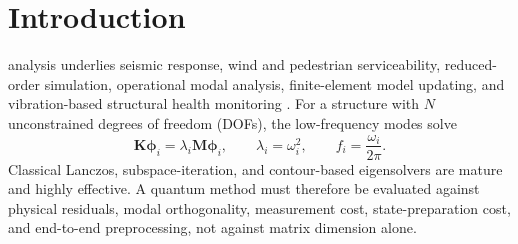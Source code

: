 \documentclass{ieeeaccess}
\newcommand{\M}{\mathbf{M}}
\newcommand{\K}{\mathbf{K}}
\newcommand{\ph}{\boldsymbol{\phi}}
\newcommand{\PARstart}{\IEEEPARstart}
\begin{document}
\section{Introduction}
\label{sec:intro}

\PARstart{M}{odal} analysis underlies seismic response, wind and pedestrian serviceability, reduced-order simulation, operational modal analysis, finite-element model updating, and vibration-based structural health monitoring \cite{Chopra2020,Ewins2000,FarrarWorden2007,FarrarWorden2012}. For a structure with $N$ unconstrained degrees of freedom (DOFs), the low-frequency modes solve
\begin{equation}
\K\ph_i=\lambda_i\M\ph_i,
\qquad \lambda_i=\omega_i^2,
\qquad f_i=\frac{\omega_i}{2\pi}.
\label{eq:gep}
\end{equation}
Classical Lanczos, subspace-iteration, and contour-based eigensolvers are mature and highly effective. A quantum method must therefore be evaluated against physical residuals, modal orthogonality, measurement cost, state-preparation cost, and end-to-end preprocessing, not against matrix dimension alone.
\end{document}
